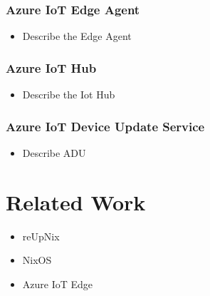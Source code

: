 \subsubsection{Azure IoT Edge Agent}
\begin{tcolorbox}[title=TODO]
    \begin{itemize}
        \item Describe the Edge Agent
    \end{itemize}
\end{tcolorbox}

\subsubsection{Azure IoT Hub}
\begin{tcolorbox}[title=TODO]
    \begin{itemize}
        \item Describe the Iot Hub
    \end{itemize}
\end{tcolorbox}

\subsubsection{Azure IoT Device Update Service}
\begin{tcolorbox}[title=TODO]
    \begin{itemize}
        \item Describe ADU
    \end{itemize}
\end{tcolorbox}

\section{Related Work}
\begin{tcolorbox}[title=TODO]
    \begin{itemize}
        \item reUpNix
        \item NixOS
        \item Azure IoT Edge
    \end{itemize}
\end{tcolorbox}
